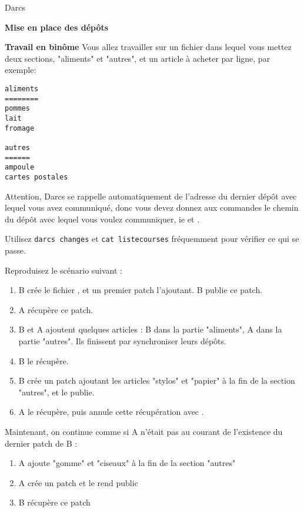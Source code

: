 \documentclass[10pt]{article}\usepackage[nu]{esial}
\begin{document}
\begin{part}{Darcs}
\begin{Exercice} {\bf Mise en place des dépôts}
\end{Exercice}


\begin{Exercice} {\bf Travail en binôme}
Vous allez travailler sur un fichier 
dans lequel vous mettez deux sections, "aliments" et "autres",
et un article à acheter par ligne, par exemple:
\begin{Verbatim}
aliments
========
pommes
lait
fromage

autres
======
ampoule
cartes postales
\end{Verbatim}

Attention, Darcs se rappelle
automatiquement de l'adresse du dernier dépôt avec lequel vous
avez communiqué, donc
vous devez donnez aux commandes le chemin du dépôt avec
lequel vous voulez communiquer, ie
 et .

Utilisez {\tt darcs changes} et
{\tt cat listecourses} fréquemment pour vérifier ce qui se passe.

Reproduisez le scénario suivant :

\begin{enumerate}
\item B crée le fichier , et un premier patch l'ajoutant.
      B publie ce patch.
\item A récupère ce patch. 
\item B et A ajoutent quelques articles : B dans la partie "aliments", A dans la
      partie "autres". Ils finissent par synchroniser leurs dépôts.
\item B le récupère.
\item B crée un patch ajoutant les articles "stylos" et "papier"
      à la fin de la section "autres", et le publie.
\item A le récupère, puis annule cette récupération avec .
\end{enumerate}

\bigskip

Maintenant, on continue comme si A n'était pas au courant
de l'existence du dernier patch de B :
\begin{enumerate}
\item A ajoute "gomme" et "ciseaux" à la fin de la section "autres"
\item A crée un patch et le rend public
\item B récupère ce patch
\end{enumerate}


\end{Exercice}
\end{part}
\end{document}

